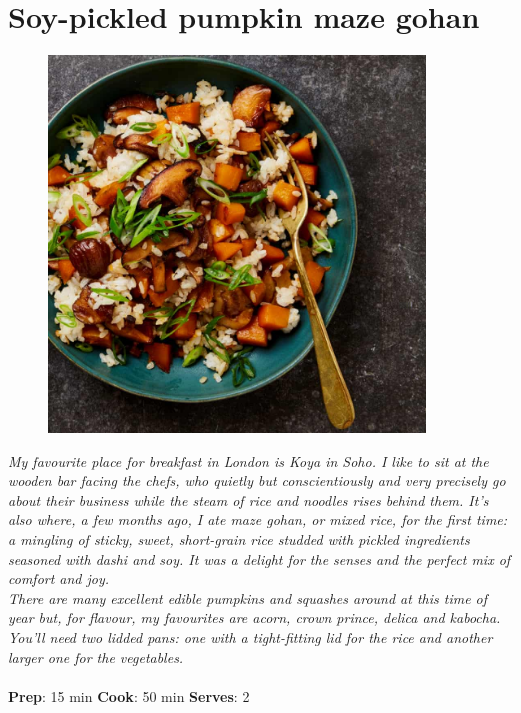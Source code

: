 \documentclass{book}
\begin{document}
\section{Soy-pickled pumpkin maze gohan}
\begin{figure}
\centering\includegraphics[width=10cm,height=10cm,keepaspectratio]{Recipe_Pictures/Soy-pickled_pumpkin_maze_gohan.png}
\end{figure}
\emph{My favourite place for breakfast in London is Koya in Soho. I like to sit at the wooden bar facing the chefs, who quietly but conscientiously and very precisely go about their business while the steam of rice and noodles rises behind them. It’s also where, a few months ago, I ate maze gohan, or mixed rice, for the first time: a mingling of sticky, sweet, short-grain rice studded with pickled ingredients seasoned with dashi and soy. It was a delight for the senses and the perfect mix of comfort and joy.\\ 
There are many excellent edible pumpkins and squashes around at this time of year but, for flavour, my favourites are acorn, crown prince, delica and kabocha. You’ll need two lidded pans: one with a tight-fitting lid for the rice and another larger one for the vegetables.}\\\\ 
\textbf{Prep}: 15 min
\textbf{Cook}: 50 min
\textbf{Serves}: 2
\end{document}
